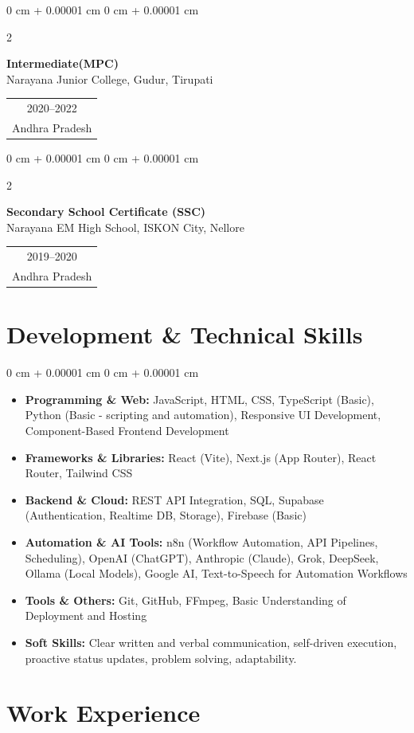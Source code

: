 \documentclass[10pt, a4paper]{article}
\makeatletter
\newenvironment{highlights}{
    \begin{itemize}[
        topsep=0.06 cm,
        parsep=0.04 cm,
        partopsep=0pt,
        itemsep=0.02 cm,
        leftmargin=0 cm + 10pt
    ]
}{
    \end{itemize}
}
\newenvironment{onecolentry}{
    \begin{adjustwidth}{
        0 cm + 0.00001 cm
    }{
        0 cm + 0.00001 cm
    }
}{
    \end{adjustwidth}
}
\newenvironment{twocolentry}[2][4.5 cm]{
    \onecolentry
    \def\secondColumn{#2}
    \setcolumnwidth{\fill, #1}
    \begin{paracol}{2}
}{
    \switchcolumn \raggedleft \secondColumn
    \end{paracol}
    \endonecolentry
}
\newcommand{\eduDateBlock}[2]{
    \begin{tabular}[t]{@{}c@{}}
        \normalsize #1 \\
        \normalsize #2
    \end{tabular}
}
\makeatother
\begin{document}
    \vspace{0.10 cm}
    \begin{twocolentry}{
        \eduDateBlock{2020--2022}{Andhra Pradesh}
    }
        \textbf{Intermediate(MPC)}\\
        Narayana Junior College, Gudur, Tirupati
    \end{twocolentry}

    \vspace{0.10 cm}
    \begin{twocolentry}{
        \eduDateBlock{2019--2020}{Andhra Pradesh}
    }
        \textbf{Secondary School Certificate (SSC)}\\
        Narayana EM High School, ISKON City, Nellore
    \end{twocolentry}

    \section{Development \& Technical Skills}

    \begin{onecolentry}
        \begin{highlights}
            \item \textbf{Programming \& Web:} JavaScript, HTML, CSS, TypeScript (Basic), Python (Basic - scripting and automation), Responsive UI Development, Component-Based Frontend Development
            \item \textbf{Frameworks \& Libraries:} React (Vite), Next.js (App Router), React Router, Tailwind CSS
            \item \textbf{Backend \& Cloud:} REST API Integration, SQL, Supabase (Authentication, Realtime DB, Storage), Firebase (Basic)
            \item \textbf{Automation \& AI Tools:} n8n (Workflow Automation, API Pipelines, Scheduling), OpenAI (ChatGPT), Anthropic (Claude), Grok, DeepSeek, Ollama (Local Models), Google AI, Text-to-Speech for Automation Workflows
            \item \textbf{Tools \& Others:} Git, GitHub, FFmpeg, Basic Understanding of Deployment and Hosting
            \item \textbf{Soft Skills:} Clear written and verbal communication, self-driven execution, proactive status updates, problem solving, adaptability.
        \end{highlights}
    \end{onecolentry}

    \section{Work Experience}
\end{document}

